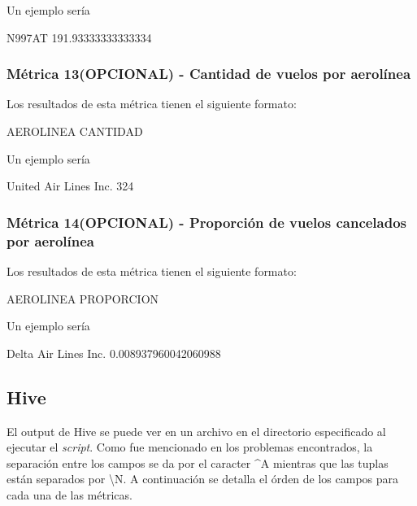 \documentclass[a4paper,10pt]{article}
\begin{document}
            Un ejemplo sería\\
            \begin{center}
                N997AT  191.93333333333334\\
            \end{center}

        \subsubsection{Métrica 13(OPCIONAL) - Cantidad de vuelos por aerolínea}
            Los resultados de esta métrica tienen el siguiente formato:\\
            \begin{center}
                AEROLINEA CANTIDAD\\
            \end{center}

            Un ejemplo sería\\
            \begin{center}
               United Air Lines Inc.   324\\
            \end{center}

         \subsubsection{Métrica 14(OPCIONAL) - Proporción de vuelos cancelados por aerolínea}
            Los resultados de esta métrica tienen el siguiente formato:\\
            \begin{center}
                AEROLINEA PROPORCION\\
            \end{center}

            Un ejemplo sería\\
            \begin{center}
               Delta Air Lines Inc.    0.008937960042060988\\
            \end{center}

        \subsection{Hive}
        El output de Hive se puede ver en un archivo en el directorio especificado al ejecutar el \textit{script}. Como fue mencionado en los problemas encontrados, la separación entre los campos se da por el caracter \^{}A mientras que las tuplas están separados por \textbackslash N.
        A continuación se detalla el órden de los campos para cada una de las métricas.
\end{document}
